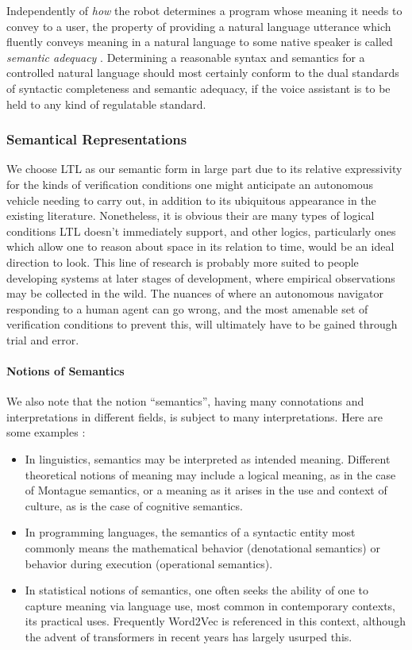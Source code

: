 \documentclass[a4paper, 11pt]{article}
\begin{document}
Independently of \emph{how} the robot determines a program whose meaning it
needs to convey to a user, the property of providing a natural language
utterance which fluently conveys meaning in a natural language to some native
speaker is called \emph{semantic adequacy} \cite{macmillan2021}. Determining a
reasonable syntax and semantics for a controlled natural language should most
certainly conform to the dual standards of syntactic completeness and semantic
adequacy, if the voice assistant is to be held to any kind of regulatable
standard.


\subsubsection{Semantical Representations}

We choose LTL as our semantic form in large part due to its relative
expressivity for the kinds of verification conditions one might anticipate an
autonomous vehicle needing to carry out, in addition to its ubiquitous
appearance in the existing literature. Nonetheless, it is obvious their are many
types of logical conditions LTL doesn't immediately support, and other logics,
particularly ones which allow one to reason about space in its relation to time,
would be an ideal direction to look. This line of research is probably more
suited to people developing systems at later stages of development, where
empirical observations may be collected in the wild. The nuances of where an
autonomous navigator responding to a human agent can go wrong, and the most
amenable set of verification conditions to prevent this, will ultimately have to
be gained through trial and error.

\paragraph{Notions of Semantics}

We also note that the notion ``semantics'', having many connotations and interpretations in
different fields, is subject to many interpretations. Here are some examples :

\begin{itemize}

\item In linguistics, semantics may be interpreted as intended meaning.
Different theoretical notions of meaning may include a logical meaning, as in
the case of Montague semantics, or a meaning as it arises in the use and context
of culture, as is the case of cognitive semantics.
\item In programming languages, the semantics of a syntactic entity most
commonly means the mathematical behavior (denotational semantics) or behavior
during execution (operational semantics).
\item In statistical notions of semantics, one often seeks the ability of one to
capture meaning via language use, most common in contemporary contexts, its
practical uses. Frequently Word2Vec \cite{word2vec} is referenced in this context,
although the advent of transformers in recent years has largely usurped this. 
\end{itemize}
\end{document}
